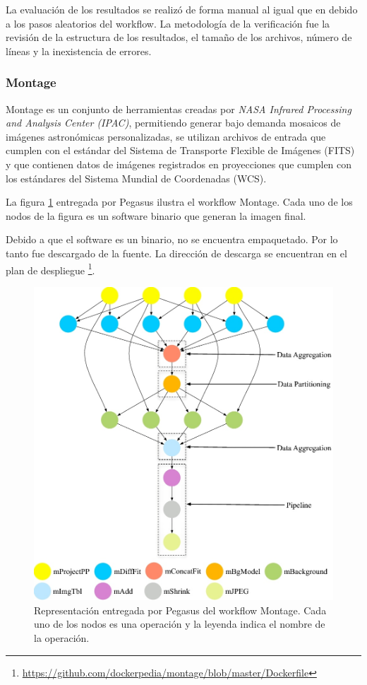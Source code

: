 La evaluación de los resultados se realizó de forma manual al igual que en \cite{santana2017reproducibility} debido a los pasos aleatorios del workflow. La metodología de la verificación fue la revisión de la estructura de los resultados, el tamaño de los archivos, número de líneas y la inexistencia de errores.

\subsubsection{Montage}

Montage es un conjunto de herramientas creadas por \textit{NASA Infrared Processing and Analysis Center (IPAC)}, permitiendo generar bajo demanda mosaicos de imágenes astronómicas personalizadas, se utilizan archivos de entrada que cumplen con el estándar del Sistema de Transporte Flexible de Imágenes (FITS) y que contienen datos de imágenes registrados en proyecciones que cumplen con los estándares del Sistema Mundial de Coordenadas (WCS).

La figura \ref{fig:montage} entregada por Pegasus ilustra el workflow Montage. Cada uno de los nodos de la figura es un software binario que generan la imagen final.

Debido a que el software es un binario, no se encuentra empaquetado. Por lo tanto fue descargado de la fuente. La dirección de descarga se encuentran en el plan de despliegue \footnote{\url{https://github.com/dockerpedia/montage/blob/master/Dockerfile}}. 

\begin{figure}[t]
\centering
\includegraphics[width=.5\textwidth]{Figures/montage}
\caption{Representación entregada por Pegasus del workflow Montage. Cada uno de los nodos es una operación y la leyenda indica el nombre de la operación.}\label{fig:montage}
\end{figure}

